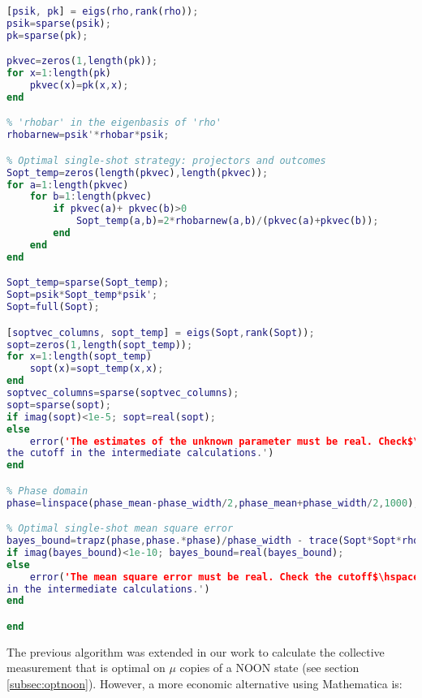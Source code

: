 \begin{lstlisting}[language=Matlab, mathescape=true]
% Eigenvalues and eigenvectors of 'rho'
[psik, pk] = eigs(rho,rank(rho));
psik=sparse(psik);
pk=sparse(pk);

pkvec=zeros(1,length(pk));
for x=1:length(pk)
    pkvec(x)=pk(x,x);
end

% 'rhobar' in the eigenbasis of 'rho'
rhobarnew=psik'*rhobar*psik;

% Optimal single-shot strategy: projectors and outcomes
Sopt_temp=zeros(length(pkvec),length(pkvec));
for a=1:length(pkvec)
    for b=1:length(pkvec)
        if pkvec(a)+ pkvec(b)>0
            Sopt_temp(a,b)=2*rhobarnew(a,b)/(pkvec(a)+pkvec(b));
        end
    end
end

Sopt_temp=sparse(Sopt_temp);
Sopt=psik*Sopt_temp*psik';
Sopt=full(Sopt);

[soptvec_columns, sopt_temp] = eigs(Sopt,rank(Sopt));
sopt=zeros(1,length(sopt_temp));
for x=1:length(sopt_temp)
    sopt(x)=sopt_temp(x,x);
end
soptvec_columns=sparse(soptvec_columns);
sopt=sparse(sopt);
if imag(sopt)<1e-5; sopt=real(sopt);
else
    error('The estimates of the unknown parameter must be real. Check$\hspace{0.15em}\swarrow$
the cutoff in the intermediate calculations.')
end

% Phase domain
phase=linspace(phase_mean-phase_width/2,phase_mean+phase_width/2,1000);

% Optimal single-shot mean square error
bayes_bound=trapz(phase,phase.*phase)/phase_width - trace(Sopt*Sopt*rho);
if imag(bayes_bound)<1e-10; bayes_bound=real(bayes_bound);
else
    error('The mean square error must be real. Check the cutoff$\hspace{0.15em}\swarrow$
in the intermediate calculations.')
end

end
\end{lstlisting}

The previous algorithm was extended in our work \cite{jesus2018} to calculate the collective measurement that is optimal on $\mu$ copies of a NOON state (see section \ref{subsec:optnoon}). However, a more economic alternative using Mathematica is:

